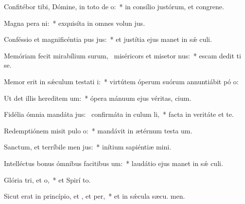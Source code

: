 \item Confitébor tibi, Dómine, in toto de o:~* in consílio justórum, et congrene.
\item Magna pera ni:~* exquisíta in omnes volun jus.
\item Conféssio et magnificéntia pus jus:~* et justítia ejus manet in sǽ culi.
\item Memóriam fecit mirabílium surum,~\pscross{} miséricors et misetor nus:~* escam dedit ti se.
\item Memor erit in sǽculum testati i:~* virtútem óperum suórum annuntiábit pó o:
\item Ut det illis hereditem um:~* ópera mánuum ejus véritas,  cium.
\item Fidélia ómnia mandáta jus:~\pscross{} confirmáta in culum li,~* facta in veritáte et te.
\item Redemptiónem misit pulo o:~* mandávit in ætérnum testa um.
\item Sanctum, et terríbile men jus:~* inítium sapiéntiæ  mini.
\item Intelléctus bonus ómnibus facitibus um:~* laudátio ejus manet in sǽ culi.
\item Glória tri, et o,~* et Spirí to.
\item Sicut erat in princípio, et , et per,~* et in sǽcula sæcu. men.
